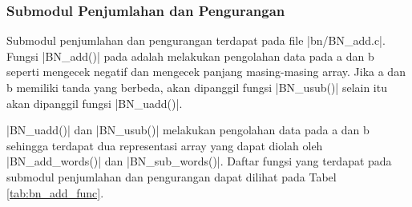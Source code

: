 \subsubsection{Submodul Penjumlahan dan Pengurangan}
  Submodul penjumlahan dan pengurangan terdapat pada file |bn/BN_add.c|. Fungsi |BN_add()| pada adalah melakukan pengolahan data pada a dan b seperti mengecek negatif dan mengecek panjang masing-masing array. Jika a dan b memiliki tanda yang berbeda, akan dipanggil fungsi |BN_usub()| selain itu akan dipanggil fungsi |BN_uadd()|.

  |BN_uadd()| dan |BN_usub()| melakukan pengolahan data pada a dan b sehingga terdapat dua representasi array yang dapat diolah oleh |BN_add_words()| dan |BN_sub_words()|. Daftar fungsi yang terdapat pada submodul penjumlahan dan pengurangan dapat dilihat pada Tabel \ref{tab:bn_add_func}.

